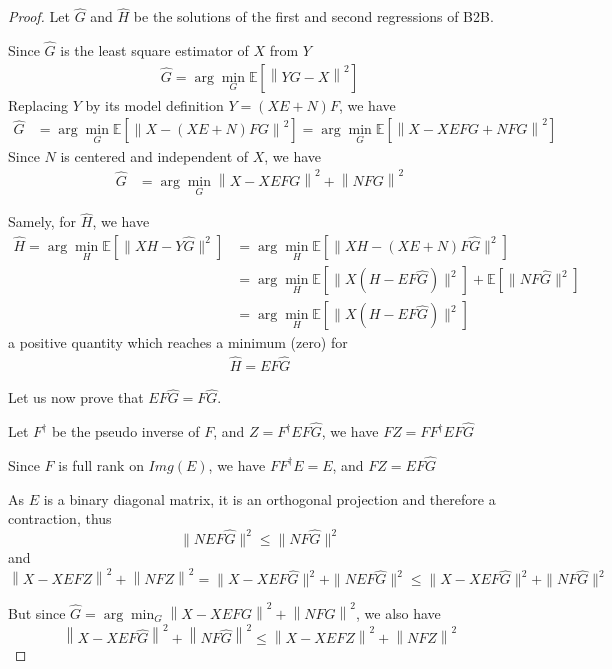 \begin{proof}

 Let $\hat G$ and $\hat H$ be the solutions of the first and second regressions of B2B.

 Since $\hat G$ is the least square estimator of $X$ from $Y$
 \begin{align*}
    \hat G = \arg \min_G \mathbb{E}[\left \| YG - X \right \|^2]
\end{align*}
Replacing $Y$ by its model definition $Y = (XE+N)F$, we have
 \begin{align*}
    \hat G &=   \arg \min_G \mathbb{E}[\left \| X - (XE + N)FG \right\|^2] =\arg \min_G \mathbb{E}[\left \| X - XEFG + NFG \right\|^2]
  \end{align*}
  Since $N$ is centered and independent of $X$, we have
  \begin{align}
    	  \hat G &=  \arg \min_G \left \| X - XEFG\right\| ^2  + \left \| NFG\right \| ^2
     \label{eq:Gdoublenorm}
\end{align}

Samely, for $\hat H$, we have
\begin{align*}
    \hat H = \arg \min_H \mathbb{E}[\| XH - Y \hat{G} \|^2] &=\arg  \min_H \mathbb{E}[\| XH - (XE + N)F \hat G \|^2] \\
    &=\arg \min_H \mathbb{E}[\| X(H - EF \hat G) \| ^2] + \mathbb{E}[\| NF\hat G \| ^2]\\
    &= \arg \min_H \mathbb{E}[\| X(H - EF \hat G) \| ^2]
 \end{align*}
 a positive quantity which reaches a minimum (zero) for
 \begin{align}
    \hat H = EF \hat G
    \label{eq:Hdoublenom}
\end{align}

Let us now prove that $EF\hat G = F\hat G$.

Let $F^\dagger$ be the pseudo inverse of $F$, and $Z=F^\dagger EF\hat G$, we have $FZ = FF^\dagger EF \hat G$

Since $F$ is full rank on $Img(E)$, we have $FF^\dagger E =E$, and $FZ = EF\hat G$

As $E$ is a binary diagonal matrix, it is an orthogonal projection and therefore a contraction, thus
 $$ \| NEF\hat G\|^2 \leq \| NF\hat G \|^2$$ and
 $$\left \| X - XEFZ\right \| ^2  + \left \| NFZ\right \| ^2 = \| X - XEF\hat G \| ^2  + \| NEF\hat G \| ^2 \leq \| X - XEF\hat G \| ^2  + \| NF\hat G \| ^2$$

But since $\hat G =  \arg \min_G \left \| X - XEFG\right\| ^2  + \left \| NFG\right \| ^2$, we also have
$$\left \| X - XEF\hat G\right\| ^2  + \left \| NF\hat G\right \| ^2 \leq \left \| X - XEFZ\right \| ^2  + \left \| NFZ\right \| ^2$$


\end{proof}
